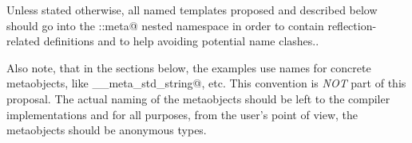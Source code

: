 Unless stated otherwise, all named templates proposed and described below should
go into the \verb@std::meta@ nested namespace in order to contain reflection-related
definitions and to help avoiding potential name clashes..

Also note, that in the sections below, the examples use names for concrete
metaobjects, like \verb@__meta_std_string@, etc. This convention
is {\em NOT} part of this proposal. The actual naming of the metaobjects
should be left to the compiler implementations and for all purposes,
from the user's point of view, the metaobjects should be anonymous types.



















